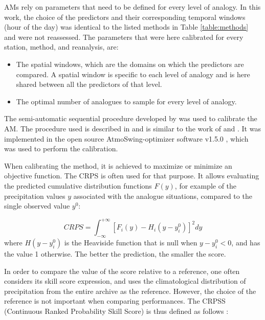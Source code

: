 \documentclass{ametsoc}
\begin{document}
AMs rely on parameters that need to be defined for every level of analogy. In this work, the choice of the predictors and their corresponding temporal windows (hour of the day) was identical to the listed methods in Table \ref{table:methods} and were not reassessed. The parameters that were here calibrated for every station, method, and reanalysis, are:

\begin{itemize}
	\item The spatial windows, which are the domains on which the predictors are compared. A spatial window is specific to each level of analogy and is here shared between all the predictors of that level.
	\item The optimal number of analogues to sample for every level of analogy.
\end{itemize}

The semi-automatic sequential procedure developed by \citet{Bontron2004} was used to calibrate the AM. The procedure used is described in \citet{Horton2017c} and is similar to the work of \citet{Radanovics2013} and \citet{BenDaoud2016}. It was implemented in the open source AtmoSwing-optimizer software v1.5.0 \citep[www.atmoswing.org,][]{Horton2017a}, which was used to perform the calibration.

When calibrating the method, it is achieved to maximize or minimize an objective function. The CRPS \citep[Continuous Ranked Probability Score,][]{Brown1974, Matheson1976, Hersbach2000} is often used for that purpose. It allows evaluating the predicted cumulative distribution functions $F(y)$, for example of the precipitation values $y$ associated with the analogue situations, compared to the single observed value $y^{0}$:

\begin{equation}
\label{eq:CRPS}
CRPS = \int_{-\infty}^{+\infty} \left[ F_{i}(y)-H_{i}(y-y_{i}^{0})\right]^{2} dy
\end{equation}
where $H(y-y_{i}^{0})$ is the Heaviside function that is null when $y-y_{i}^{0}<0$, and has the value 1 otherwise. The better the prediction, the smaller the score.

In order to compare the value of the score relative to a reference, one often considers its skill score expression, and uses the climatological distribution of precipitation from the entire archive as the reference. However, the choice of the reference is not important when comparing performances. The CRPSS (Continuous Ranked Probability Skill Score) is thus defined as follows \citep{Bradley2011}:
\end{document}

